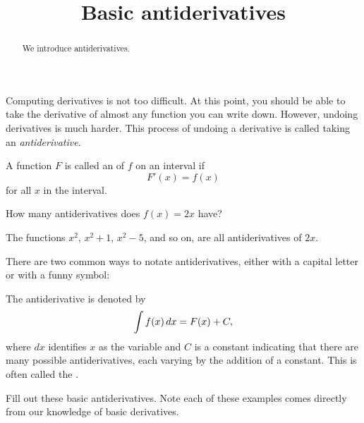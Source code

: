 \documentclass{ximera}
\title[Dig-In:]{Basic antiderivatives}
\begin{document}
\begin{abstract}
  We introduce antiderivatives.
\end{abstract}
\maketitle


Computing derivatives is not too difficult. At this point, you should
be able to take the derivative of almost any function you can write
down. However, undoing derivatives is much harder. This process of
undoing a derivative is called taking an \textit{antiderivative}.

\begin{definition}
A function $F$ is called an  of $f$ on an
interval if
\[
F'(x) = f(x)
\]
for all $x$ in the interval.
\end{definition}


\begin{question}
  How many antiderivatives does $f(x) = 2x$ have?
  \begin{multipleChoice}
  \end{multipleChoice}
  \begin{feedback}
    The functions $x^2$, $x^2+1$, $x^2-5$, and so on, are all
    antiderivatives of $2x$.
  \end{feedback}
\end{question}

There are two common ways to notate antiderivatives, either with a
capital letter or with a funny symbol:

\begin{definition}
The antiderivative is denoted by
\[
\int f(x) \,d x = F(x)+C,
\]
where $dx$ identifies $x$ as the variable and $C$ is a constant
indicating that there are many possible antiderivatives, each varying by
the addition of a constant.  This is often called the
.
\end{definition}

Fill out these basic antiderivatives. Note each of these examples comes
directly from our knowledge of basic derivatives.
\end{document}
